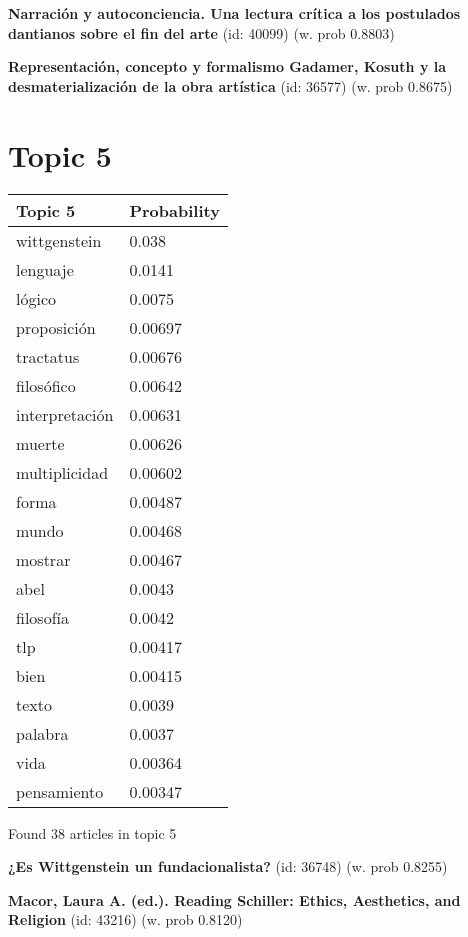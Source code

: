 \documentclass{article}
\begin{document}
\textbf{Narración y autoconciencia. Una lectura crítica a los postulados dantianos sobre el fin del arte} (id: 40099)
 (w. prob 0.8803)
\vfill

\textbf{Representación, concepto y formalismo Gadamer, Kosuth y la desmaterialización de la obra artística} (id: 36577)
 (w. prob 0.8675)

\vfill
\newpage


\centering
\thispagestyle{empty}
\section*{Topic 5}\vfill
\begin{tabular}{ll}
\toprule
        Topic 5 & Probability \\
\midrule
   wittgenstein &       0.038 \\
       lenguaje &      0.0141 \\
         lógico &      0.0075 \\
    proposición &     0.00697 \\
      tractatus &     0.00676 \\
     filosófico &     0.00642 \\
 interpretación &     0.00631 \\
         muerte &     0.00626 \\
  multiplicidad &     0.00602 \\
          forma &     0.00487 \\
          mundo &     0.00468 \\
        mostrar &     0.00467 \\
           abel &      0.0043 \\
      filosofía &      0.0042 \\
            tlp &     0.00417 \\
           bien &     0.00415 \\
          texto &      0.0039 \\
        palabra &      0.0037 \\
           vida &     0.00364 \\
    pensamiento &     0.00347 \\
\bottomrule
\end{tabular}

\vfill
Found 38 articles in topic 5
\vfill

\textbf{¿Es Wittgenstein un fundacionalista?} (id: 36748)
 (w. prob 0.8255)
\vfill

\textbf{Macor, Laura A. (ed.). Reading Schiller:  Ethics, Aesthetics, and Religion} (id: 43216)
 (w. prob 0.8120)
\vfill
\end{document}
